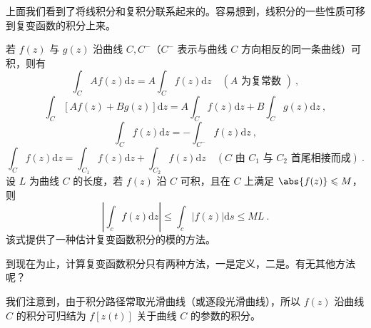 上面我们看到了将线积分和复积分联系起来的。容易想到，线积分的一些性质可移到复变函数的积分上来。

若 $f(z)$ 与 $g(z)$ 沿曲线 $C,C^-$（$C^-$ 表示与曲线 $C$ 方向相反的同一条曲线）可积，则有
\begin{equation}
\int_{C} A f(z) \mathrm{d} z=A \int_{C} f(z) \mathrm{d} z \quad(A \text { 为复常数 })~,
\end{equation}
\begin{equation}
\int_{C}[Af(z)+ Bg(z)] \mathrm{d} z= A\int_{C} f(z) \mathrm{d} z + B\int_{C} g(z) \mathrm{d} z~,
\end{equation}
\begin{equation} 
\int_{C} f(z) \mathrm{d} z=-\int_{C^{-}} f(z) \mathrm{d} z~,
\end{equation}
\begin{equation}
\int_{C} f(z) \mathrm{d} z=\int_{C_{1}} f(z) \mathrm{d} z+\int_{C_{2}} f(z) \mathrm{d} z \quad\left(C \text{ 由 } C_{1} \text{ 与 } C_{2} \text { 首尾相接而成}\right)~.
\end{equation}
设 $ L$ 为曲线 $C$ 的长度，若 $f (z)$ 沿 $C$ 可积，且在 $C$ 上满足 $\abs{f(z)} \leqslant M $，则
\begin{equation} \label{eq_CpxInt_2}
\left|\int_{c} f(z) \mathrm{d} z\right| \leqslant \int_{c}|f(z)| \mathrm{d} s \leqslant M L~.
\end{equation}
该式提供了一种估计复变函数积分的模的方法。


到现在为止，计算复变函数积分只有两种方法，一是定义，二是。有无其他方法呢？

我们注意到，由于积分路径常取光滑曲线（或逐段光滑曲线），所以 $ f (z) $ 沿曲线 $C $ 的积分可归结为 $f [z(t)]$ 关于曲线 $C$ 的参数的积分。

